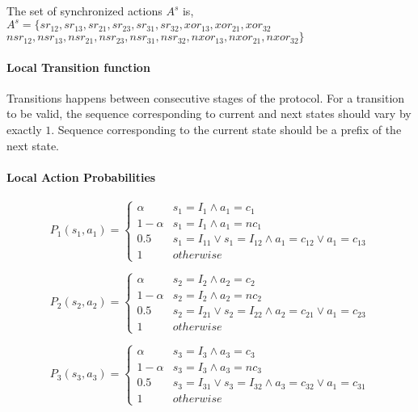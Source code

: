 The set of synchronized actions $A^s$ is, \newline
$A^s = \{ sr_{12},sr_{13},sr_{21},sr_{23},sr_{31},sr_{32}, xor_{13}, xor_{21} , xor_{32} $\newline$
nsr_{12},nsr_{13},nsr_{21},nsr_{23},nsr_{31},nsr_{32}, nxor_{13}, nxor_{21} , nxor_{32}
\}$

\paragraph{Local Transition function}
Transitions happens between consecutive stages of the protocol. For a transition to be valid, the sequence corresponding to current and next states should vary by exactly $1$. Sequence corresponding to the current state should be a prefix of the next state.

\paragraph{Local Action Probabilities}

\begin{equation*}
P_1(s_1,a_1)=
\begin{cases}
\alpha &  s_1=I_1 \wedge a_1=c_1  \\
1 - \alpha &  s_1=I_1 \wedge a_1=nc_1  \\
0.5 &  s_1=I_{11} \vee s_1=I_{12}  \wedge a_1=c_{12} \vee a_1=c_{13} \\
1 & otherwise
\end{cases}	
\end{equation*}

\begin{equation*}
P_2(s_2,a_2)=
\begin{cases}
\alpha &  s_2=I_2 \wedge a_2=c_2  \\
1 - \alpha &  s_2=I_2 \wedge a_2=nc_2  \\
0.5 &  s_2=I_{21} \vee s_2=I_{22}  \wedge a_2=c_{21} \vee a_1=c_{23} \\
1 & otherwise
\end{cases}	
\end{equation*}

\begin{equation*}
P_3(s_3,a_3)=
\begin{cases}
\alpha &  s_3=I_3 \wedge a_3=c_3  \\
1 - \alpha &  s_3=I_3 \wedge a_3=nc_3  \\
0.5 &  s_3=I_{31} \vee s_3=I_{32}  \wedge a_3=c_{32} \vee a_1=c_{31} \\
1 & otherwise
\end{cases}	
\end{equation*}


